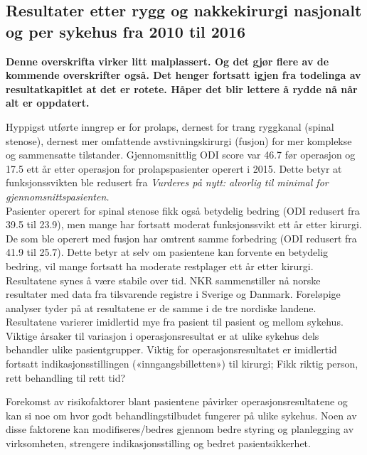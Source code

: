 \documentclass [norsk,a4paper,twoside]{article}\usepackage[]{graphicx}\usepackage[]{color}
\begin{document}
\subsection{ Resultater etter rygg og nakkekirurgi nasjonalt og per sykehus fra 2010 til 2016}
\textbf{Denne overskrifta virker litt malplassert. Og det gjør flere av de kommende overskrifter også. Det henger fortsatt igjen fra todelinga av resultatkapitlet at det er rotete. Håper det blir lettere å rydde nå når alt er oppdatert.}



Hyppigst utførte inngrep er for prolaps, dernest for trang ryggkanal (spinal stenose),
dernest mer omfattende avstivningskirurgi (fusjon) for mer komplekse og
sammensatte tilstander. 
Gjennomsnittlig ODI score var 46.7 før operasjon og 17.5 ett år etter
operasjon for prolapspasienter operert i 2015. Dette betyr at funksjonssvikten ble redusert fra 
\textit{Vurderes på nytt: alvorlig til minimal for gjennomsnittspasienten.} \\

Pasienter operert for spinal stenose fikk også
betydelig bedring (ODI redusert fra 39.5 til 23.9), men mange har fortsatt moderat
funksjonssvikt ett år etter kirurgi. 
De som ble operert med fusjon har
omtrent samme forbedring (ODI redusert fra 41.9 til 25.7). Dette betyr at selv om
pasientene kan forvente en betydelig bedring, vil mange fortsatt ha moderate restplager
ett år etter kirurgi. Resultatene synes å være stabile over tid. NKR
sammenstiller nå norske resultater med data fra tilsvarende registre i Sverige og
Danmark. Foreløpige analyser tyder på at resultatene er de samme i
de tre nordiske landene.
Resultatene varierer imidlertid mye fra pasient til pasient og mellom sykehus.
Viktige årsaker til variasjon i operasjonsresultat er at ulike sykehus dels behandler
ulike pasientgrupper. Viktig for operasjonsresultatet er imidlertid fortsatt
indikasjonsstillingen («inngangsbilletten») til kirurgi; Fikk riktig person, rett
behandling til rett tid?

Forekomst av risikofaktorer blant pasientene påvirker operasjonsresultatene og kan
si noe om hvor godt behandlingstilbudet fungerer på ulike sykehus. Noen av disse
faktorene kan modifiseres/bedres gjennom bedre styring og planlegging av
virksomheten, strengere indikasjonsstilling og bedret pasientsikkerhet.
\end{document}
